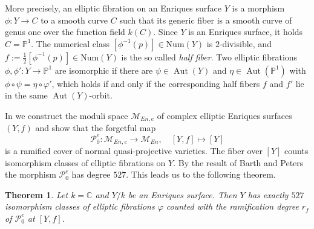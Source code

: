 \documentclass{amsart}
\theoremstyle{definition}
\theoremstyle{plain}
\newtheorem{theorem}[definition]{Theorem}
\DeclareMathOperator{\Aut}{Aut}
\newcommand{\PP}{\mathbb{P}}
\newcommand{\M}{\mathcal{M}}
\renewcommand{\P}{\mathcal{P}}
\newcommand{\Num}{\textrm{Num}}
\begin{document}
More precisely, an elliptic fibration on an Enriques surface $Y$ is a morphism $\phi \colon Y \to C$ to a smooth curve $C$ such that its generic fiber is a smooth curve of genus one over the function field $k(C)$. Since $Y$ is an Enriques surface, it holds $C=\mathbb{P}^1$. The numerical class $\left[\phi^{-1}\left(p\right)\right]\in\Num\left(Y\right)$ is $2$-divisible, and  $f:=\frac{1}{2} [\phi^{-1}(p)] \in\Num\left(Y\right)$ is the so called \emph{half fiber}.
Two elliptic fibrations $\phi,\phi'\colon Y\to\mathbb{P}^1$ are isomorphic if there are $\psi \in \Aut(Y)$ and $\eta \in \Aut(\PP^1)$ with $\phi\circ \psi = \eta \circ \varphi'$, which holds if and only if the corresponding half fibers $f$ and $f'$ lie in the same $\Aut(Y)$-orbit.

In  we construct the moduli space $\M_{En,e}$ of complex elliptic Enriques surfaces $(Y,f)$ and show that the forgetful map
\[\P^e_0\colon \M_{En,e} \to \M_{En}, \quad [Y,f] \mapsto [Y]\]
is a ramified cover of normal quasi-projective varieties. The fiber over $[Y]$ counts isomorphism classes of elliptic fibrations on $Y$. By the result of Barth and Peters the morphism $\P^e_0$ has degree $527$. This leads us to the following theorem.

\begin{theorem}\label{thm:intro}
Let $k = \mathbb{C}$ and $Y/k$ be an Enriques surface. Then $Y$ has exactly $527$ isomorphism classes of elliptic fibrations $\varphi$ counted with the ramification degree
$r_f$ of $\P^e_0$ at $[Y,f]$.
\end{theorem}
\end{document}
